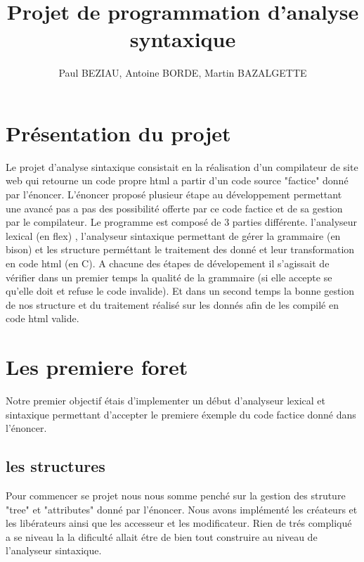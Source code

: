 \documentclass[12pt]{article}
\begin{document}
\title{Projet de programmation d'analyse syntaxique}
\author{Paul BEZIAU, Antoine BORDE, Martin BAZALGETTE}

\maketitle
\newpage
\tableofcontents
\newpage


\section{Présentation du projet}
Le projet d'analyse sintaxique consistait en la réalisation d'un compilateur
de site web qui retourne un code propre html a partir d'un code source "factice"
donné par l'énoncer.
\newline
L'énoncer proposé plusieur étape au développement permettant une avancé
pas a pas des possibilité offerte par ce code factice et de sa gestion
par le compilateur.
\newline
Le programme est composé de 3 parties différente. l'analyseur lexical (en flex) ,
l'analyseur sintaxique permettant de gérer la grammaire (en bison) et les structure
perméttant le traitement des donné et leur transformation en code html (en C).
\newline
A chacune des étapes de dévelopement il s'agissait de vérifier dans un premier
temps la qualité de la grammaire (si elle accepte se qu'elle doit et refuse
le code invalide). Et dans un second temps la bonne gestion de nos structure
et du traitement réalisé sur les donnés afin de les compilé en code html valide.

\newpage

\section{Les premiere foret}

Notre premier objectif étais d'implementer un début d'analyseur lexical et sintaxique
permettant d'accepter le premiere éxemple du code factice donné dans l'énoncer.

\subsection{les structures}

Pour commencer se projet nous nous somme penché sur la gestion des struture
"tree" et "attributes" donné par l'énoncer. Nous avons implémenté les créateurs et les
libérateurs ainsi que les accesseur et les modificateur. Rien de trés compliqué a se niveau
la la dificulté allait étre de bien tout construire au niveau de l'analyseur sintaxique.
\end{document}
